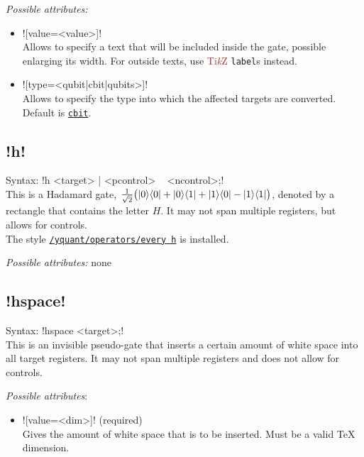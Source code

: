 \documentclass{scrartcl}
\def\TikZ{\textcolor{brown}{Ti\textit kZ}}
\def\gate#1{\hyperref[gate:#1]{\texttt{#1}}}
\def\style#1{\hyperref[style:#1]{\texttt{#1}}}
\def\ketbra#1#2{\ket{#1}\!\bra{#2}}
\begin{document}
         \emph{Possible attributes:}
         \begin{itemize}
            \item \yquant![value=<value>]! \\
               Allows to specify a text that will be included inside the gate, possible enlarging its width.
               For outside texts, use \TikZ{} \texttt{label}s instead.
            \item \yquant![type=<qubit|cbit|qubits>]! \\
               Allows to specify the type into which the affected targets are converted.
               Default is \gate{cbit}.
         \end{itemize}
      
      \subsection{\texorpdfstring{\yquant!h!}{h}}\label{gate:h}
         Syntax: \yquant!h <target> | <pcontrol> ~ <ncontrol>;! \\
         This is a Hadamard gate, $\frac{1}{\sqrt2} \bigl( \ketbra00 + \ketbra01 + \ketbra10 - \ketbra11 \bigr)$, denoted by a rectangle that contains the letter $H$.
         It may not span multiple registers, but allows for controls. \\
         The style \style{/yquant/operators/every h} is installed.
         
         \emph{Possible attributes:} none
      
      \subsection{\texorpdfstring{\yquant!hspace!}{hspace}}\label{gate:hspace}
         Syntax: \yquant!hspace <target>;! \\
         This is an invisible pseudo\hyp gate that inserts a certain amount of white space into all target registers.
         It may not span multiple registers and does not allow for controls.
         
         \emph{Possible attributes}:
         \begin{itemize}
            \item \yquant![value=<dim>]! (required) \\
               Gives the amount of white space that is to be inserted. Must be a valid \TeX{} dimension.
         \end{itemize}
      
\end{document}
